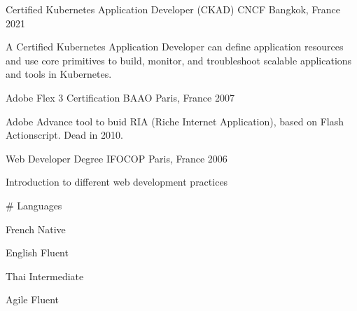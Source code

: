 

\begin{cventries}
  \cventry
    {Certified Kubernetes Application Developer (CKAD)} %
    {CNCF} %
    {Bangkok, France} %
    {2021} %
    {
      \begin{cvitems} %
        \item {A Certified Kubernetes Application Developer can define application resources and use core primitives to build, monitor, and troubleshoot scalable applications and tools in Kubernetes.}
      \end{cvitems}
    }
    { } %

  \cventry
    {Adobe Flex 3 Certification} %
    {BAAO} %
    {Paris, France} %
    {2007} %
    {
      \begin{cvitems} %
        \item {Adobe Advance tool to buid RIA (Riche Internet Application), based on Flash Actionscript. Dead in 2010.}
      \end{cvitems}
    }
    { } %
  \cventry
    {Web Developer Degree} %
    {IFOCOP} %
    {Paris, France} %
    {2006} %
    {
      \begin{cvitems} %
        \item {Introduction to different web development practices}
      \end{cvitems}
    }
    { } %

  \cventry
    {} %
    {\# Languages} %
    { } %
    { } %
    {
      \begin{cvitems} %
        \item {French Native}
        \item {English Fluent}
        \item {Thai Intermediate}
        \item {Agile Fluent}
      \end{cvitems}
    }
    { } %

\end{cventries}

